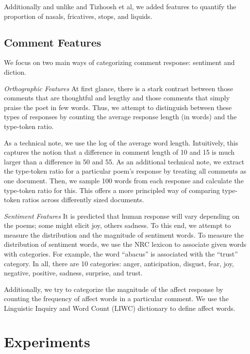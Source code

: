 \documentclass[11pt]{article}
\begin{document}
Additionally and unlike  and Tizhoosh et al, we added features to quantify the proportion of nasals, fricatives, stops, and liquids. 


\subsection*{Comment Features}
We focus on two main ways of categorizing comment response: sentiment and diction.

\emph{Orthographic Features}
At first glance, there is a stark contrast between those comments that are thoughtful and lengthy and those comments that simply praise the poet in few words. Thus, we attempt to distinguish between these types of responses by counting the average response length (in words) and the type-token ratio.

As a technical note, we use the log of the average word length. Intuitively, this captures the notion that a difference in comment length of 10 and 15 is much larger than a difference in 50 and 55. As an additional technical note, we extract the type-token ratio for a particular poem's response by treating all comments as one document. Then, we sample 100 words from each response and calculate the type-token ratio for this. This offers a more principled way of comparing type-token ratios across differently sized documents.

\emph{Sentiment Features}
It is predicted that human response will vary depending on the poems; some might elicit joy, others sadness. To this end, we attempt to measure the distribution and the magnitude of sentiment words. To measure the distribution of sentiment words, we use the NRC lexicon to associate given words with categories. For example, the word ``abacus'' is associated with the ``trust'' category. In all, there are 10 categories: anger, anticipation, disgust, fear, joy, negative, positive, sadness, surprise, and trust.

Additionally, we try to categorize the magnitude of the affect response by counting the frequency of affect words in a particular comment. We use the Linguistic Inquiry and Word Count (LIWC) dictionary to define affect words.

\section{Experiments}
\end{document}
